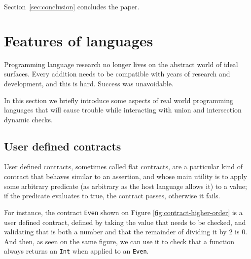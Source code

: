 \documentclass[sigplan,10pt,review,anonymous]{acmart}
\newcommand{\info}[2][1=]{}
\newcommand{\nickel}[1]{\lstinline[language=nickel]{#1}}
\begin{document}
Section~\ref{sec:conclusion} concludes the paper.

\newpage

\section{Features of languages}
\label{sec:feat-lang}
\info{Zoology of various features that we will eventually show
  conflict with this or that property or implementation of union and
  intersection. Including user-define contracts.}

Programming language research no longer lives on the abstract world
of ideal surfaces.
Every addition needs to be compatible with years of research
and development, and this is hard.
Success was unavoidable.

In this section we briefly introduce some aspects of real world
programming languages that will cause trouble while interacting
with union and intersection dynamic checks.

\subsection*{User defined contracts}
\label{sec:flat-contracts}

User defined contracts, sometimes called flat contracts, are a particular
kind of contract that behaves similar to an assertion, and whose
main utility is to apply some arbitrary predicate (as arbitrary as the
host language allows it) to a value; if the predicate evaluates to
true, the contract passes, otherwise it fails.

For instance, the contract \nickel{Even} shown on Figure
\ref{fig:contract-higher-order} is a user defined contract, defined
by taking the value that needs to be checked, and validating
that is both a number and that the remainder of dividing it by 2
is 0.
And then, as seen on the same figure, we can use it to check that a function always
returns an \nickel{Int} when applied to an \nickel{Even}.

\end{document}
